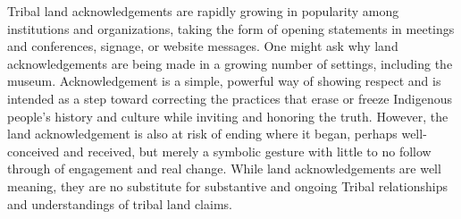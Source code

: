 \documentclass{report}
\begin{document}
              Tribal land acknowledgements are rapidly growing in popularity among institutions and organizations, taking the form of opening statements in meetings and conferences, signage, or website messages. One might ask why land acknowledgements are being made in a growing number of settings, including the museum. Acknowledgement is a simple, powerful way of showing respect and is intended as a step toward correcting the practices that erase or freeze Indigenous people’s history and culture while inviting and honoring the truth. However, the land acknowledgement is also at risk of ending where it began, perhaps well-conceived and received, but merely a symbolic gesture with little to no follow through of engagement and real change. While land acknowledgements are well meaning, they are no substitute for substantive and ongoing Tribal relationships and understandings of tribal land claims.
\end{document}
